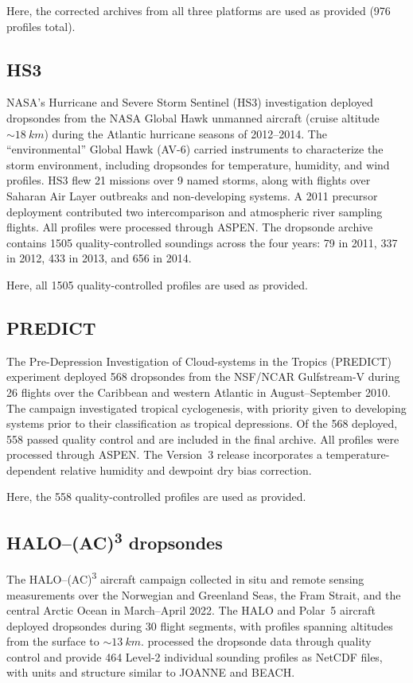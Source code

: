 \documentclass[11pt]{article}
\begin{document}
Here, the corrected archives from all three platforms are used as provided (976 profiles total).

\subsection{HS3}

NASA's Hurricane and Severe Storm Sentinel (HS3) investigation \citep{braun2016} deployed dropsondes from the NASA Global Hawk unmanned aircraft (cruise altitude ${\sim}\SI{18}{km}$) during the Atlantic hurricane seasons of 2012--2014.  The ``environmental'' Global Hawk (AV-6) carried instruments to characterize the storm environment, including dropsondes for temperature, humidity, and wind profiles.  HS3 flew 21 missions over 9 named storms, along with flights over Saharan Air Layer outbreaks and non-developing systems.  A 2011 precursor deployment contributed two intercomparison and atmospheric river sampling flights.  All profiles were processed through ASPEN.  The dropsonde archive contains 1505 quality-controlled soundings across the four years: 79 in 2011, 337 in 2012, 433 in 2013, and 656 in 2014.

Here, all 1505 quality-controlled profiles are used as provided.

\subsection{PREDICT}

The Pre-Depression Investigation of Cloud-systems in the Tropics (PREDICT) experiment \citep{montgomery2012} deployed 568 dropsondes from the NSF/NCAR Gulfstream-V during 26 flights over the Caribbean and western Atlantic in August--September 2010.  The campaign investigated tropical cyclogenesis, with priority given to developing systems prior to their classification as tropical depressions.  Of the 568 deployed, 558 passed quality control and are included in the final archive.  All profiles were processed through ASPEN.  The Version~3 release incorporates a temperature-dependent relative humidity and dewpoint dry bias correction.

Here, the 558 quality-controlled profiles are used as provided.

\subsection{HALO--(AC)\textsuperscript{3} dropsondes}

The HALO--(AC)\textsuperscript{3} aircraft campaign \citep{ehrlich2025} collected in situ and remote sensing measurements over the Norwegian and Greenland Seas, the Fram Strait, and the central Arctic Ocean in March--April 2022.  The HALO and Polar~5 aircraft deployed dropsondes during 30 flight segments, with profiles spanning altitudes from the surface to ${\sim}\SI{13}{km}$.  \citet{george2024} processed the dropsonde data through quality control and provide 464 Level-2 individual sounding profiles as NetCDF files, with units and structure similar to JOANNE and BEACH.
\end{document}

